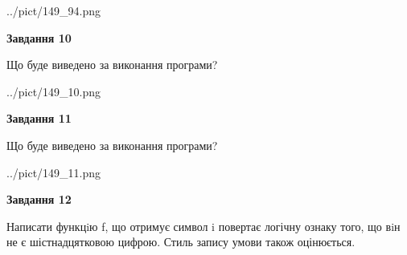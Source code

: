\documentclass[12pt, ukrainian]{article}
\begin{document}
{\begin {large}
\begin{center}
	{../pict/149_94.png}
\end{center}
\newpage

{\begin {center}\textbf{Завдання 10}\end {center}}

Що буде виведено за виконання програми?\par
\begin{center}
	{../pict/149_10.png}
\end{center}
\newpage

{\begin {center}\textbf{Завдання 11}\end {center}}

Що буде виведено за виконання програми?\par
\begin{center}
	{../pict/149_11.png}
\end{center}
\newpage

{\begin {center}\textbf{Завдання 12}\end {center}}


Написати функцiю f, що отримує символ i повертає логічну ознаку того, що вiн не є шістнадцятковою цифрою. Стиль запису умови також оцінюється.\par
\newpage

\end {large}}
\end{document}
